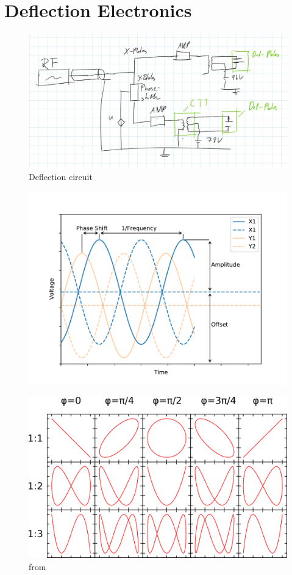 
\chapter{Deflection Electronics}

\begin{figure}
	\centering
	\includegraphics[width=0.7\linewidth]{Chapters/Deflection/deflec_circuit}
	\caption{Deflection circuit}
	\label{fig:defleccircuit}
\end{figure}

\begin{figure}
	\centering
	\includegraphics[width=0.7\linewidth]{Chapters/Deflection/VoltageAspects}
	\caption{}
	\label{fig:VoltageAspects}
\end{figure}

\begin{figure}
	\centering
	\includegraphics[width=0.7\linewidth]{Chapters/Deflection/Lissajous}
	\caption{ from \cite{Wikipedia Lissajous}}
	\label{fig:Lissajous}
\end{figure}






